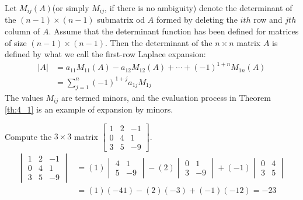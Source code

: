 \documentclass[../main.tex]{subfiles}
\begin{document}
\begin{theorem} \label{th:4_1}
  Let \(M_{ij}(A)\)(or simply \(M_{ij}\), if there is no ambiguity) denote the determinant of the \((n-1) \times (n-1)\) submatrix od \(A\) formed by deleting the \(ith\) row and \(jth\) column of \(A\). Assume that the determinant function has been defined for matrices of size \((n-1) \times (n-1)\). Then the determinant of the \(n \times n\) matrix \(A\) is defined by what we call the first-row Laplace expansion: 
  \begin{equation*}
    \begin{aligned}
      |A| &= a_{11}M_{11}(A)-a_{12}M_{12}(A) + \cdots + (-1)^{1+n}M_{1n}(A) \\
          &= \sum^{n}_{j=1}(-1)^{1+j}a_{1j}M_{1j}
    \end{aligned}
  \end{equation*}
  The values \(M_{ij}\) are termed minors, and the evaluation process in Theorem \ref{th:4_1} is an example of expansion by minors.
\end{theorem}

\begin{example} \label{ex:4_3}
  Compute the \(3 \times 3\) matrix \(
  \begin{bmatrix}
    1 & 2 & −1 \\
    0 & 4 & 1 \\
    3 & 5 & −9 
  \end{bmatrix}
  \).
  \begin{equation*}
    \begin{aligned}
      \begin{vmatrix}
        1 & 2 & −1 \\
        0 & 4 & 1 \\
        3 & 5 & −9 
      \end{vmatrix}
      &= (1)
      \begin{vmatrix}
        4 & 1 \\
        5 & -9 
      \end{vmatrix}
      -(2)
      \begin{vmatrix}
        0 & 1 \\
        3 & -9 
      \end{vmatrix}
      +(-1)
      \begin{vmatrix}
        0 & 4 \\
        3 & 5 
      \end{vmatrix}\\
      &= (1)(-41)-(2)(-3)+(-1)(-12) = -23 
    \end{aligned}
  \end{equation*}
\end{example}
\end{document}
